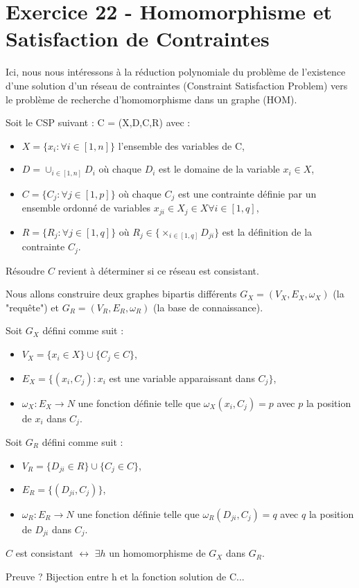 
\section{Exercice 22 - Homomorphisme et Satisfaction de Contraintes}\label{ex22}
Ici, nous nous int\'eressons \`a la r\'eduction polynomiale du probl\`eme de l'existence
d'une solution d'un r\'eseau de contraintes (Constraint Satisfaction Problem)
vers le probl\`eme de recherche d'homomorphisme dans un graphe (HOM).

Soit le CSP suivant : C = (X,D,C,R) avec :
\spacelist
\begin{itemize}
	\item $X = \{x_i : \forall i \in [1,n]\}$ l'ensemble des variables de C,
	\item $D = \cup_{i \in [1,n]}D_i$ o\`u chaque $D_i$ est le domaine de la variable
	$x_i \in X$,
	\item $C = \{C_j : \forall j \in [1,p]\}$ o\`u chaque $C_j$ est une contrainte
	d\'efinie par un ensemble ordonn\'e de variables $x_{ji} \in X_j \in X \forall i \in
	[1,q]$,
	\item $R = \{R_j : \forall j \in [1,q]\}$ o\`u $R_j \in \{\times_{i \in [1,q]}D_{ji}\}$ est
	la d\'efinition de la contrainte $C_j$.\\
\end{itemize}
R\'esoudre $C$ revient \`a d\'eterminer si ce r\'eseau est consistant.

Nous allons construire deux graphes bipartis diff\'erents $G_{X} = (V_X,E_X,\omega_X)$ (la
"requ\^ete") et $G_R = (V_R,E_R,\omega_R)$ (la base de connaissance).

Soit $G_X$ d\'efini comme suit :
\spacelist
\begin{itemize}
	\item $V_X = \{x_i \in X\} \cup \{C_j \in C\}$,
	\item $E_X = \{(x_i,C_j) : x_i$ est une variable apparaissant dans $C_j \}$,
	\item $\omega_X : E_X \rightarrow N$ une fonction d\'efinie telle que
	$\omega_X(x_i,C_j) = p$ avec $p$ la position de $x_i$ dans $C_j$.\\
\end{itemize}

Soit $G_R$ d\'efini comme suit :
\spacelist
\begin{itemize}
	\item $V_R = \{D_{ji} \in R\} \cup \{C_j \in C\}$,
	\item $E_R = \{(D_{ji},C_j)\}$,
	\item $\omega_R : E_R \rightarrow N$ une fonction d\'efinie telle que
	$\omega_R(D_{ji},C_j) = q$ avec $q$ la position de $D_{ji}$ dans $C_j$.\\
\end{itemize}

$C$ est consistant $\leftrightarrow$ $\exists h$ un homomorphisme de $G_X$ dans $G_R$.

Preuve ?
Bijection entre h et la fonction solution de C...

